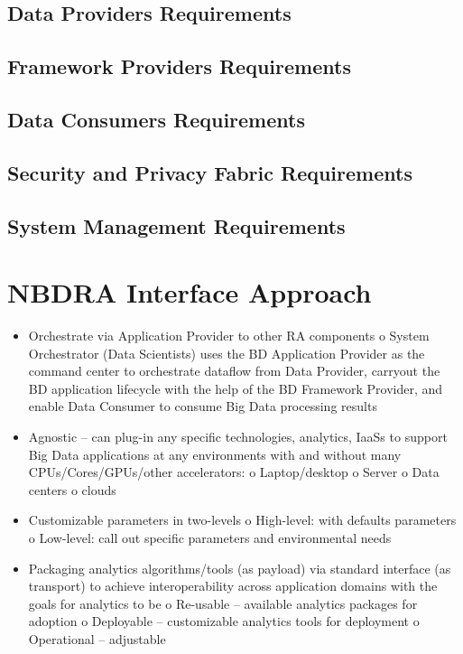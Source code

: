 \documentclass[11pt]{article}
\newcommand{\TODO}[1]{\todo{#1}}
\begin{document}
\TODO{TBD}
\subsection{Data Providers Requirements }

\TODO{TBD}
\subsection{Framework Providers Requirements }

\TODO{TBD}
\subsection{Data Consumers Requirements }

\TODO{TBD}
\subsection{Security and Privacy Fabric Requirements }

\TODO{TBD}
\subsection{System Management Requirements }

\TODO{TBD}

\section{NBDRA Interface Approach}

\TODO{text}

\begin{itemize}
\item	Orchestrate via Application Provider to other RA components
o	System Orchestrator (Data Scientists) uses the BD Application Provider as the command 
center to orchestrate dataflow from Data Provider, carryout the BD application lifecycle 
with the help of the BD Framework Provider, and enable Data Consumer to consume Big 
Data processing results 
\item	Agnostic – can plug-in any specific technologies, analytics, IaaSs to support Big Data 
applications at any environments with and without many CPUs/Cores/GPUs/other accelerators:
o	Laptop/desktop
o	Server
o	Data centers
o	clouds
\item	Customizable parameters in two-levels
o	High-level: with defaults parameters
o	Low-level: call out specific parameters and environmental needs
\item	Packaging analytics algorithms/tools (as payload) via standard interface (as transport) to achieve 
interoperability across application domains with the goals for analytics to be
o	Re-usable – available analytics packages for adoption
o	Deployable – customizable analytics tools for deployment
o	Operational – adjustable 
\end{itemize}
\end{document}
